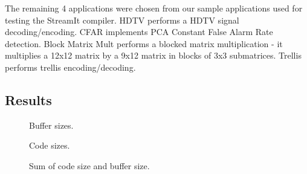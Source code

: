 The remaining 4 applications were chosen from our sample applications
used for testing the StreamIt compiler. HDTV performs a HDTV signal
decoding/encoding. CFAR implements PCA Constant False Alarm Rate
detection. Block Matrix Mult performs a blocked matrix multiplication
- it multiplies a 12x12 matrix by a 9x12 matrix in blocks of 3x3
submatrices. Trellis performs trellis encoding/decoding.

\begin{comment}

\subsection{Methodology}
\label{sec:results:methodology}

The following data has been collected: number of nodes, number of
node executions per steady state, schedule size and buffer size
for pseudo single appearance and minimal latency schedules.

\subsubsection{Schedule Compression}

\end{comment}

\subsection{Results}
\label{sec:results:results}

\begin{figure}[t]
\caption{Buffer sizes.\protect\label{fig:buffergraph}}
\end{figure}

\begin{figure}[t]
\caption{Code sizes.\protect\label{fig:codegraph}}
\end{figure}

\begin{figure}[t]
\caption{Sum of code size and buffer size.\protect\label{fig:sumgraph}}
\end{figure}

